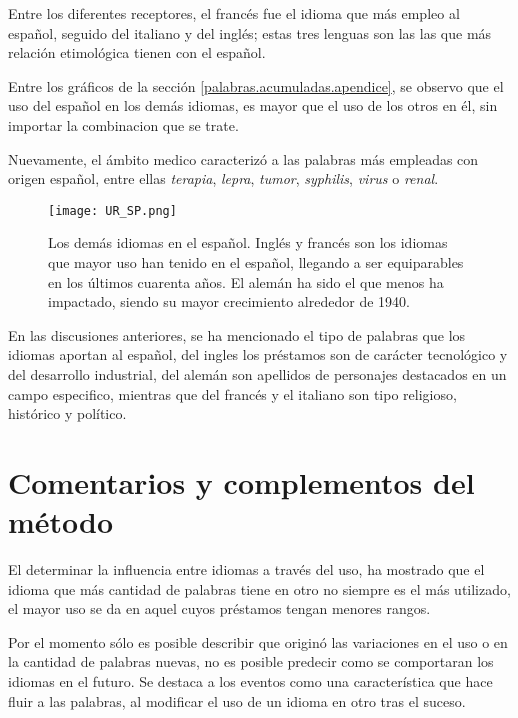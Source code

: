 Entre los diferentes receptores, el francés fue el idioma que más empleo al español, seguido del italiano y del inglés; estas tres lenguas son las las que más relación etimológica tienen con el español.  

Entre los gráficos de la sección \ref{palabras.acumuladas.apendice}, se observo que el uso del español en los demás idiomas, es mayor que el uso de los otros en él, sin importar la combinacion que se trate.

Nuevamente,  el ámbito medico caracterizó a las palabras más empleadas con origen español, entre ellas \textit{terapia}, \textit{lepra}, \textit{tumor}, \textit{syphilis}, \textit{virus} o \textit{renal}. 

		
\begin{figure}[h!] %
	\centering
	\texttt{[image: UR\_SP.png]}
	\label{fig.ST_b_SP}
	\caption{Los demás idiomas en el español. Inglés y francés son los idiomas que mayor uso han tenido en el español, llegando a ser equiparables en los últimos cuarenta años. El alemán ha sido el que menos ha impactado, siendo su mayor crecimiento  alrededor de 1940.}
	\label{fig.UR_SP}
\end{figure}


En las discusiones anteriores, se ha mencionado el tipo de palabras que los idiomas aportan al español, del ingles los préstamos son de carácter tecnológico y del desarrollo industrial, del alemán son apellidos de personajes destacados en un campo especifico, mientras que del francés y el italiano son tipo religioso, histórico y político. 






\section{Comentarios y complementos del método} %


El determinar la influencia entre idiomas a través del uso, ha mostrado que el idioma que más cantidad de palabras tiene en otro no siempre es el más utilizado, el mayor uso se da en aquel cuyos préstamos tengan menores rangos. 

Por el momento sólo es posible describir que originó las variaciones en el uso o en la cantidad de palabras nuevas, no es posible predecir como se comportaran los idiomas en el futuro. Se destaca a los eventos como una característica que  hace fluir a las palabras, al modificar el uso de un idioma en otro tras el suceso. 


